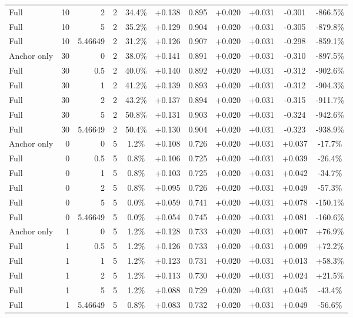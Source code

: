 \begin{table}[htbp]
\begin{tabular}{lrrrccccccc}
Full & 10 & 2 & 2 & 34.4\% & +0.138 & 0.895 & +0.020 & +0.031 & -0.301 & -866.5\% \\
Full & 10 & 5 & 2 & 35.2\% & +0.129 & 0.904 & +0.020 & +0.031 & -0.305 & -879.8\% \\
Full & 10 & 5.46649 & 2 & 31.2\% & +0.126 & 0.907 & +0.020 & +0.031 & -0.298 & -859.1\% \\
Anchor only & 30 & 0 & 2 & 38.0\% & +0.141 & 0.891 & +0.020 & +0.031 & -0.310 & -897.5\% \\
Full & 30 & 0.5 & 2 & 40.0\% & +0.140 & 0.892 & +0.020 & +0.031 & -0.312 & -902.6\% \\
Full & 30 & 1 & 2 & 41.2\% & +0.139 & 0.893 & +0.020 & +0.031 & -0.312 & -904.3\% \\
Full & 30 & 2 & 2 & 43.2\% & +0.137 & 0.894 & +0.020 & +0.031 & -0.315 & -911.7\% \\
Full & 30 & 5 & 2 & 50.8\% & +0.131 & 0.903 & +0.020 & +0.031 & -0.324 & -942.6\% \\
Full & 30 & 5.46649 & 2 & 50.4\% & +0.130 & 0.904 & +0.020 & +0.031 & -0.323 & -938.9\% \\
Anchor only & 0 & 0 & 5 & 1.2\% & +0.108 & 0.726 & +0.020 & +0.031 & +0.037 & -17.7\% \\
Full & 0 & 0.5 & 5 & 0.8\% & +0.106 & 0.725 & +0.020 & +0.031 & +0.039 & -26.4\% \\
Full & 0 & 1 & 5 & 0.8\% & +0.103 & 0.725 & +0.020 & +0.031 & +0.042 & -34.7\% \\
Full & 0 & 2 & 5 & 0.8\% & +0.095 & 0.726 & +0.020 & +0.031 & +0.049 & -57.3\% \\
Full & 0 & 5 & 5 & 0.0\% & +0.059 & 0.741 & +0.020 & +0.031 & +0.078 & -150.1\% \\
Full & 0 & 5.46649 & 5 & 0.0\% & +0.054 & 0.745 & +0.020 & +0.031 & +0.081 & -160.6\% \\
Anchor only & 1 & 0 & 5 & 1.2\% & +0.128 & 0.733 & +0.020 & +0.031 & +0.007 & +76.9\% \\
Full & 1 & 0.5 & 5 & 1.2\% & +0.126 & 0.733 & +0.020 & +0.031 & +0.009 & +72.2\% \\
Full & 1 & 1 & 5 & 1.2\% & +0.123 & 0.731 & +0.020 & +0.031 & +0.013 & +58.3\% \\
Full & 1 & 2 & 5 & 1.2\% & +0.113 & 0.730 & +0.020 & +0.031 & +0.024 & +21.5\% \\
Full & 1 & 5 & 5 & 1.2\% & +0.088 & 0.729 & +0.020 & +0.031 & +0.045 & -43.4\% \\
Full & 1 & 5.46649 & 5 & 0.8\% & +0.083 & 0.732 & +0.020 & +0.031 & +0.049 & -56.6\% \\

\end{tabular}
\end{table}
